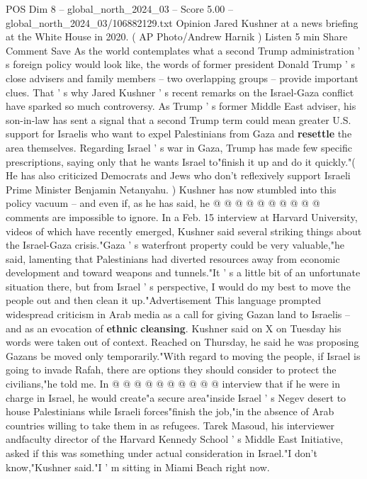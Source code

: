 \begin{textsample}{POS Dim 8 – global\_north\_2024\_03 – Score 5.00 – global\_north\_2024\_03/106882129.txt}  \label{ex:f8_pos_222}
Opinion Jared Kushner at a news briefing at the White House in 2020. ( AP Photo/Andrew Harnik ) Listen 5 min Share Comment Save As the world contemplates what a second Trump administration ' s foreign policy would look like, the words of former president Donald Trump ' s close advisers and family members -- two overlapping groups -- provide important clues.
That ' s why Jared Kushner ' s recent remarks on the Israel-Gaza conflict have sparked so much controversy.
As Trump ' s former Middle East adviser, his son-in-law has sent a signal that a second Trump term could mean greater U.S. support for Israelis who want to expel Palestinians from Gaza and \textbf{resettle} the area themselves.
Regarding Israel ' s war in Gaza, Trump has made few specific prescriptions, saying only that he wants Israel to"finish it up and do it quickly."( He has also criticized Democrats and Jews who don't reflexively support Israeli Prime Minister Benjamin Netanyahu. ) Kushner has now stumbled into this policy vacuum -- and even if, as he has said, he @ @ @ @ @ @ @ @ @ @ comments are impossible to ignore.
In a Feb. 15 interview at Harvard University, videos of which have recently emerged, Kushner said several striking things about the Israel-Gaza crisis."Gaza ' s waterfront property could be very valuable,"he said, lamenting that Palestinians had diverted resources away from economic development and toward weapons and tunnels."It ' s a little bit of an unfortunate situation there, but from Israel ' s perspective, I would do my best to move the people out and then clean it up."Advertisement This language prompted widespread criticism in Arab media as a call for giving Gazan land to Israelis -- and as an evocation of \textbf{ethnic} \textbf{cleansing}.
Kushner said on X on Tuesday his words were taken out of context.
Reached on Thursday, he said he was proposing Gazans be moved only temporarily."With regard to moving the people, if Israel is going to invade Rafah, there are options they should consider to protect the civilians,"he told me.
In @ @ @ @ @ @ @ @ @ @ interview that if he were in charge in Israel, he would create"a secure area"inside Israel ' s Negev desert to house Palestinians while Israeli forces"finish the job,"in the absence of Arab countries willing to take them in as refugees.
Tarek Masoud, his interviewer andfaculty director of the Harvard Kennedy School ' s Middle East Initiative, asked if this was something under actual consideration in Israel."I don't know,"Kushner said."I ' m sitting in Miami Beach right now.

\end{textsample}
